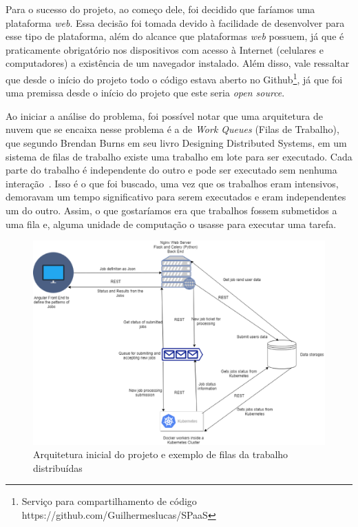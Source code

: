 \documentclass[11pt,twoside]{article}
\begin{document}
Para o sucesso do projeto, ao começo dele, foi decidido que faríamos uma plataforma \emph{web}. Essa decisão  foi tomada devido à facilidade de desenvolver para esse tipo de plataforma, além do alcance que 
plataformas \emph{web} possuem, já que é praticamente obrigatório nos dispositivos com acesso à Internet (celulares e computadores) a existência de um
navegador instalado. Além disso, vale ressaltar que desde o início do projeto todo o código estava aberto no Github\footnote{Serviço para compartilhamento de código https://github.com/Guilhermeslucas/SPaaS}, 
já que foi uma premissa desde o início do projeto que este seria \emph{open source}.

Ao iniciar a análise do problema, foi possível notar que uma arquitetura de nuvem que se encaixa nesse problema é a de \emph{Work Queues} (Filas de Trabalho), que segundo Brendan Burns em seu livro
Designing Distributed Systems, em um sistema de filas de trabalho existe uma trabalho em lote para ser executado. Cada parte do trabalho é independente do outro e pode ser executado sem nenhuma interação~\cite{BB}.
Isso é o que foi buscado, uma vez que os trabalhos eram intensivos, demoravam um tempo significativo para serem executados e eram independentes um do outro. Assim, o que gostaríamos era que trabalhos fossem submetidos
a uma fila e, alguma unidade de computação o usasse para executar uma tarefa.

\begin{figure}[!h]
  \centering
  \includegraphics[scale=0.4]{arch.eps}
  \caption{Arquitetura inicial do projeto e exemplo de filas da trabalho distribuídas}
  \label{fig:flow}
\end{figure}
\end{document}
